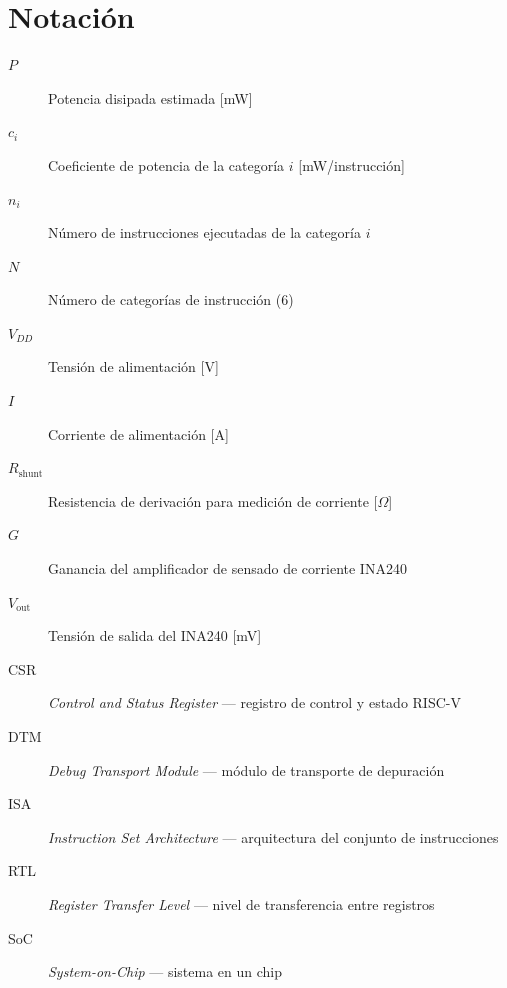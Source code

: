 \chapter*{Notación}
\thispagestyle{empty}

\begin{description}
  \item[$P$] Potencia disipada estimada [mW]
  \item[$c_i$] Coeficiente de potencia de la categoría $i$ [mW/instrucción]
  \item[$n_i$] Número de instrucciones ejecutadas de la categoría $i$
  \item[$N$] Número de categorías de instrucción (6)
  \item[$V_{DD}$] Tensión de alimentación [V]
  \item[$I$] Corriente de alimentación [A]
  \item[$R_{\text{shunt}}$] Resistencia de derivación para medición de corriente [$\Omega$]
  \item[$G$] Ganancia del amplificador de sensado de corriente INA240
  \item[$V_{\text{out}}$] Tensión de salida del INA240 [mV]
  \item[CSR] \textit{Control and Status Register} — registro de control y estado RISC-V
  \item[DTM] \textit{Debug Transport Module} — módulo de transporte de depuración
  \item[ISA] \textit{Instruction Set Architecture} — arquitectura del conjunto de instrucciones
  \item[RTL] \textit{Register Transfer Level} — nivel de transferencia entre registros
  \item[SoC] \textit{System-on-Chip} — sistema en un chip
\end{description}

\cleardoublepage

